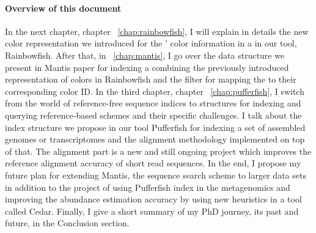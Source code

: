 \paragraph*{Overview of this document}
In the next chapter, chapter ~\ref{chap:rainbowfish}, I will explain in details the new color representation we
introduced for the \kmers' color information in a \ccdbg in our tool, Rainbowfish.
After that, in ~\ref{chap:mantis}, I go over the data structure we present in Mantis paper
for indexing a \ccdbg combining the previously introduced representation of colors in Rainbowfish and
the \cqf filter for mapping the \kmers to their corresponding color ID.
In the third chapter, chapter ~\ref{chap:pufferfish},
I switch from the world of reference-free sequence indices
to structures for indexing and querying reference-based schemes and their specific challenges.
I talk about the index structure we propose in our tool Pufferfish for indexing a set of
assembled genomes or transcriptomes and the alignment methodology implemented on top of that.
The alignment part is a new and still ongoing project which improves the reference
alignment accuracy of short read sequences.
In the end, I propose my future plan for extending Mantis, the sequence search scheme to
larger data sets in addition to the project of using Pufferfish index in the metagenomics
and improving the abundance estimation accuracy by using new heuristics in a tool called Cedar.
Finally, I give a short summary of my PhD journey, its past and future, in the Conclusion section.